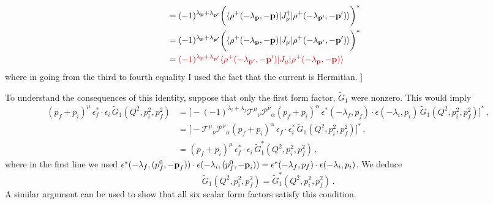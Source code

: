 {{\begin{align}
 \nonumber\\&
 = 
  (-1)^{\lambda_{\textbf{p}}+\lambda_{\textbf{p}'}}
\bigg(\langle \rho^+(-\lambda_{\textbf{p}}, -\textbf p) \vert  \mathcal \mathcal{J}^\dagger_{\mu} \vert \rho^+(-\lambda_{\textbf{p}'}, -\textbf p') \rangle \bigg)^*
 \nonumber\\
 &=
  (-1)^{\lambda_{\textbf{p}}+\lambda_{\textbf{p}'}}
 \bigg(\langle \rho^+(-\lambda_{\textbf{p}}, -\textbf p) \vert  \mathcal \mathcal{J}_{\mu} \vert \rho^+(-\lambda_{\textbf{p}'}, -\textbf p') \rangle \bigg)^* \\
 &=  {\color{red}
  (-1)^{\lambda_{\textbf{p}}+\lambda_{\textbf{p}'}}
  \langle \rho^+(-\lambda_{\textbf{p}'}, -\textbf p') \vert  \mathcal \mathcal{J}_{\mu} \vert \rho^+(-\lambda_{\textbf{p}}, -\textbf p) \rangle }
\end{align}
where in going from the third to fourth equality I used the fact that the current is Hermitian.
{}
]
}

To understand the consequences of this identity, suppose that only the first form factor, $\widetilde G_1$ were nonzero. This would imply
\begin{align}
(p_f+p_i)^\mu \,\epsilon_f^*  \cdot \epsilon_i \, \widetilde{G}_1(Q^2,p_i^2,p_f^2) & = \Big [ - (-1)^{\lambda_i+\lambda_f}  \mathcal {T^{\mu}}_\nu  \mathcal {P^{\nu}}_\alpha  (p_f+p_i)^\alpha \,\epsilon^*(- \lambda_f,  p_f) \cdot \epsilon(- \lambda_i,   p_i) \, \widetilde{G}_1(Q^2,p_i^2,p_f^2) \Big ]^* \,, \\
& =  \Big [ -    \mathcal {T^{\mu}}_\nu  \mathcal {P^{\nu}}_\alpha  (p_f+p_i)^\alpha \,\epsilon_f \cdot \epsilon^*_i \, \widetilde{G}_1(Q^2,p_i^2,p_f^2) \Big ]^* \,, \\
& =     (p_f+p_i)^\mu \,\epsilon^*_f \cdot \epsilon_i \, \widetilde{G}^*_1(Q^2,p_i^2,p_f^2)  \,,
\end{align}
where in the first line we used $\epsilon^*(- \lambda_f,  (p^0_f, - \textbf p_f)) \cdot \epsilon(- \lambda_i,   (p^0_f, - \textbf p_i)) = \epsilon^*(- \lambda_f,  p_f) \cdot \epsilon(- \lambda_i,   p_i)$. We deduce
\begin{equation}
\widetilde{G}_1(Q^2,p_i^2,p_f^2)  = \widetilde{G}^*_1(Q^2,p_i^2,p_f^2) \,.
\end{equation}
A similar argument can be used to show that all six scalar form factors satisfy this condition. {}

\bigskip
}




